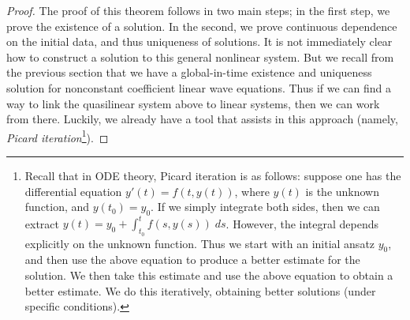 \documentclass{article}
\begin{document}
\begin{proof}
	The proof of this theorem follows in two main steps; in the first step, we prove the existence of a solution. In the second, we prove continuous dependence on the initial data, and thus uniqueness of solutions. It is not immediately clear how to construct a solution to this general nonlinear system. But we recall from the previous section that we have a global-in-time existence and uniqueness solution for nonconstant coefficient linear wave equations. Thus if we can find a way to link the quasilinear system above to linear systems, then we can work from there. Luckily, we already have a tool that assists in this approach (namely, \textit{Picard iteration}\footnote{Recall that in ODE theory, Picard iteration is as follows: suppose one has the differential equation $y'(t) = f(t, y(t))$, where $y(t)$ is the unknown function, and $y(t_{0}) = y_{0}$. If we simply integrate both sides, then we can extract $y(t) =y_{0} + \int_{t_{0}}^{t}f(s, y(s))\;ds$. However, the integral depends explicitly on the unknown function. Thus we start with an initial ansatz $y_{0}$, and then use the above equation to produce a better estimate for the solution. We then take this estimate and use the above equation to obtain a better estimate. We do this iteratively, obtaining better solutions (under specific conditions).}).  \vspace{-0.25cm} 
	

\end{proof}
\end{document}
